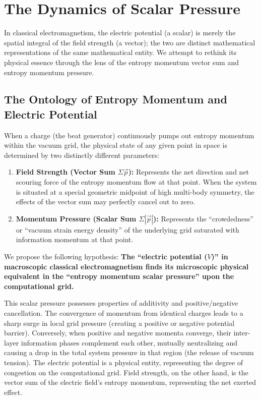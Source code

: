 \documentclass[12pt, a4paper]{article}
\begin{document}
\section{The Dynamics of Scalar Pressure}

In classical electromagnetism, the electric potential (a scalar) is merely the spatial integral of the field strength (a vector); the two are distinct mathematical representations of the same mathematical entity. We attempt to rethink its physical essence through the lens of the entropy momentum vector sum and entropy momentum pressure.

\subsection{The Ontology of Entropy Momentum and Electric Potential}

When a charge (the beat generator) continuously pumps out entropy momentum within the vacuum grid, the physical state of any given point in space is determined by two distinctly different parameters:

\begin{enumerate}
    \item \textbf{Field Strength (Vector Sum $\Sigma\vec{p}$):} Represents the net direction and net scouring force of the entropy momentum flow at that point. When the system is situated at a special geometric midpoint of high multi-body symmetry, the effects of the vector sum may perfectly cancel out to zero.
    \item \textbf{Momentum Pressure (Scalar Sum $\Sigma|\vec{p}|$):} Represents the ``crowdedness'' or ``vacuum strain energy density'' of the underlying grid saturated with information momentum at that point.
\end{enumerate}

We propose the following hypothesis: \textbf{The ``electric potential ($V$)'' in macroscopic classical electromagnetism finds its microscopic physical equivalent in the ``entropy momentum scalar pressure'' upon the computational grid.}

This scalar pressure possesses properties of additivity and positive/negative cancellation. The convergence of momentum from identical charges leads to a sharp surge in local grid pressure (creating a positive or negative potential barrier). Conversely, when positive and negative momenta converge, their inter-layer information phases complement each other, mutually neutralizing and causing a drop in the total system pressure in that region (the release of vacuum tension). The electric potential is a physical entity, representing the degree of congestion on the computational grid. Field strength, on the other hand, is the vector sum of the electric field's entropy momentum, representing the net exerted effect.
\end{document}
